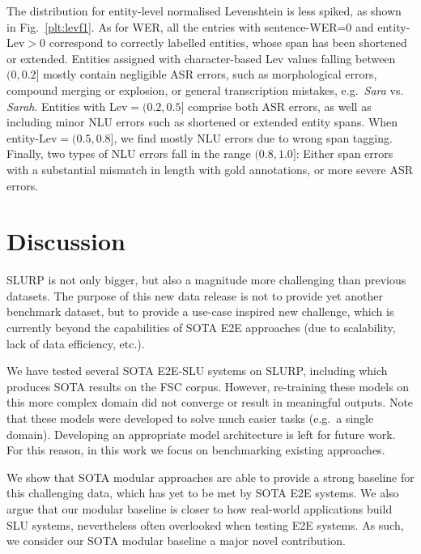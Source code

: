 \documentclass[11pt,a4paper]{article}
\newcommand{\datasetacr}{SLURP}
\newcommand{\etoe}{E2E}
\newcommand{\slu}{SLU}
\newcommand{\asr}{ASR}
\newcommand{\nlu}{NLU}
\begin{document}
The distribution for entity-level normalised Levenshtein is less spiked, as shown in Fig.\ \ref{plt:levf1}. As for WER, all the entries with sentence-WER=0 and entity-Lev$>$0 correspond to correctly labelled entities, whose span has been shortened or extended. 
Entities assigned with character-based Lev values falling between $(0,0.2]$ mostly contain negligible ASR errors, such as morphological errors, compound merging or explosion, or general transcription mistakes, e.g.\ \textit{Sara} vs. \textit{Sarah}. Entities with Lev$=(0.2,0.5]$ comprise both \asr{} errors, as well as including minor \nlu{} errors such as shortened or extended entity spans. When entity-Lev$=(0.5,0.8]$, we find mostly \nlu{} errors due to wrong span tagging. Finally, two types of \nlu{} errors fall in the range $(0.8,1.0]$: Either span errors with a substantial mismatch in length with gold annotations, or more severe \asr{} errors. 







\section{Discussion}
\label{sec:discussion}

\datasetacr{} is not only bigger, but also a magnitude more challenging than previous datasets. The purpose of this new data release is not to provide yet another benchmark dataset, but to provide a use-case inspired new challenge, which is currently beyond the capabilities of SOTA E2E approaches (due to scalability, lack of data efficiency, etc.). 

We have tested several SOTA \etoe-\slu{} systems on \datasetacr, including \cite{lugosh19:Interspeech} which produces SOTA results on the FSC corpus. However, re-training these models on this more complex domain did not converge or result in meaningful outputs. Note that these models were developed to solve much easier tasks (e.g.\ a single domain). Developing an appropriate model architecture is left for future work. For this reason, in this work we focus on benchmarking existing approaches.

We show that SOTA modular approaches are able to provide a strong baseline for this challenging data, which has yet to be met by SOTA E2E systems. We also argue that our modular baseline is closer to how real-world applications build SLU systems, nevertheless often overlooked when testing E2E systems. As such, we consider our SOTA modular baseline a major novel contribution.
\end{document}
